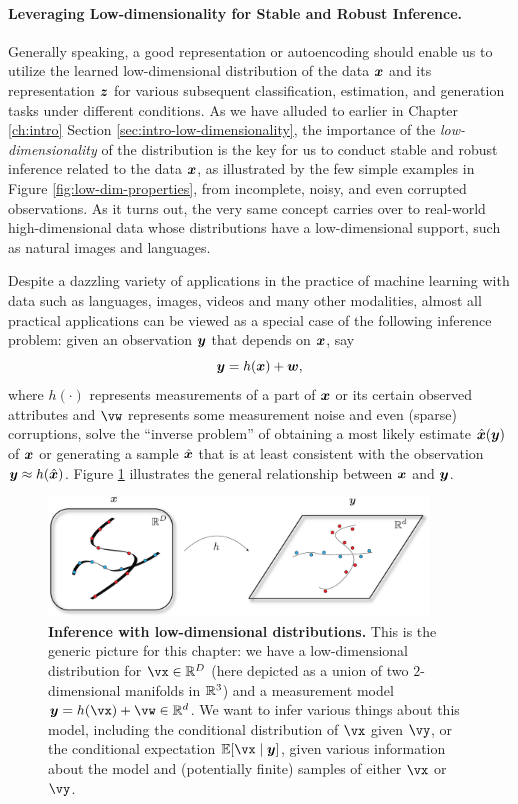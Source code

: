 \documentclass[../../book-main.tex]{subfiles}
\begin{document}
\paragraph{Leveraging Low-dimensionality for Stable and Robust Inference.}
Generally speaking, a good representation or autoencoding should enable us to utilize the learned low-dimensional distribution of the data $\bm{x}$ and its representation $\bm{z}$ for various subsequent classification, estimation, and generation tasks under different conditions. As we have alluded to earlier in Chapter \ref{ch:intro} Section \ref{sec:intro-low-dimensionality}, the importance of the {\em low-dimensionality} of the distribution is the key for us to conduct stable and robust inference related to the data $\bm{x}$, as illustrated by the few simple examples in Figure \ref{fig:low-dim-properties}, from incomplete, noisy, and even corrupted observations. As it turns out, the very same concept carries over to real-world high-dimensional data whose distributions have a low-dimensional support, such as natural images and languages. 

Despite a dazzling variety of applications in the practice of machine learning with data such as languages, images, videos and many other modalities, almost all practical applications can be viewed as a special case of the following inference problem: given an observation $\bm{y}$ that depends on $\bm{x}$, say
\begin{equation}
    \bm{y} = h(\bm{x}) + \boldsymbol{w},
\end{equation}
where $h(\cdot)$ represents measurements of a part of $\bm{x}$ or its certain observed attributes and $\vw$ represents some measurement noise and even (sparse) corruptions, solve the ``inverse problem'' of obtaining a most likely estimate $\hat {\bm{x}}(\bm{y})$ of $\bm{x}$ or generating a sample $\hat{\bm{x}}$ that is at least consistent with the observation $\bm{y} \approx h(\hat{\bm{x}})$. Figure \ref{fig:inference_roadmap} illustrates the general relationship between $\bm{x}$ and $\bm{y}$. 

\begin{figure}
  \centering 
  \includegraphics[width=0.9\textwidth]{figs_chap6/inference_roadmap.pdf}
  \caption{\small \textbf{Inference with low-dimensional distributions.} This is the generic picture for this chapter: we have a low-dimensional distribution for \(\vx \in \R^{D}\) (here depicted as a union of two \(2\)-dimensional manifolds in \(\mathbb{R}^{3}\)) and a measurement model \(\y = h(\vx) + \vw \in \R^{d}\). We want to infer various things about this model, including the conditional distribution of \(\vx\) given \(\vy\), or the conditional expectation \(\mathbb{E}[\vx \mid \y]\), given various information about the model and (potentially finite) samples of either \(\vx\) or \(\vy\).}
  \label{fig:inference_roadmap}
\end{figure}
\end{document}
